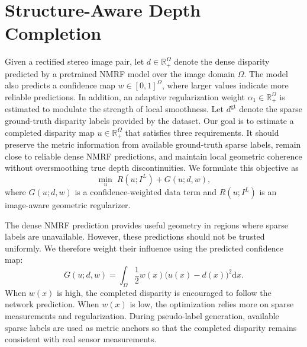 \section{Structure-Aware Depth Completion}
Given a rectified stereo image pair, let $d\in\mathbb{R}^{\Omega}_+$ denote the dense disparity predicted by a pretrained NMRF model over the image domain $\Omega$.
The model also predicts a confidence map $w\in[0,1]^{\Omega}$, where larger values indicate more reliable predictions.
In addition, an adaptive regularization weight $\alpha_1\in\mathbb{R}^{\Omega}_{+}$ is estimated to modulate the strength of local smoothness.
Let $d^{\mathrm{gt}}$ denote the sparse ground-truth disparity labels provided by the dataset.
Our goal is to estimate a completed disparity map $u\in\mathbb{R}^{\Omega}_+$ that satisfies three requirements.
It should preserve the metric information from available ground-truth sparse labels, remain close to reliable dense NMRF predictions, and maintain local geometric coherence without oversmoothing true depth discontinuities.
We formulate this objective as
\begin{equation}
	\min_{u}
	\;
	R(u; I^L)
	+
	G(u; d, w),
	\label{eq:sadc-energy}
\end{equation}
where $G(u;d,w)$ is a confidence-weighted data term and $R(u;I^L)$ is an image-aware geometric regularizer.

The dense NMRF prediction provides useful geometry in regions where sparse labels are unavailable.
However, these predictions should not be trusted uniformly.
We therefore weight their influence using the predicted confidence map:
\begin{equation}
	G(u; d, w)
	=
	\int_{\Omega}
	\frac{1}{2} w(x)
	\bigl(u(x)-d(x)\bigr)^2
	\mathrm{d}x .
	\label{eq:sadc-data}
\end{equation}
When $w(x)$ is high, the completed disparity is encouraged to follow the network prediction.
When $w(x)$ is low, the optimization relies more on sparse measurements and regularization.
During pseudo-label generation, available sparse labels are used as metric anchors so that the completed disparity remains consistent with real sensor measurements.

